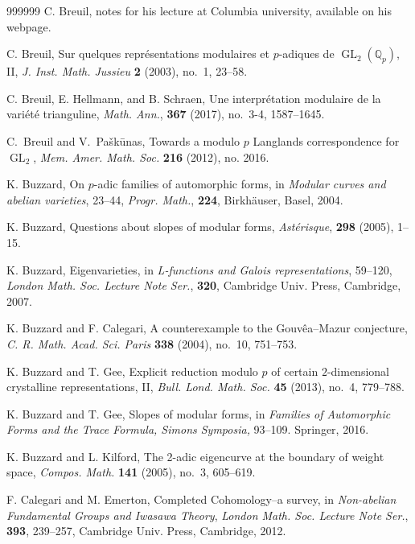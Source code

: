 \documentclass[12pt]{amsart}
\theoremstyle{definition}
\numberwithin{equation}{subsection}
\def\QQ{\mathbb{Q}}
\DeclareMathOperator{\GL}{GL}
\begin{document}
\begin{thebibliography}{999999}
C. Breuil, notes for his lecture at Columbia university, available
on his webpage.

C. Breuil, Sur quelques repr\'esentations modulaires et $p$-adiques de $\GL_2(\QQ_p)$, II, {\it
J. Inst. Math. Jussieu} {\bf 2} (2003), no.~1,  23--58.


C. Breuil, E. Hellmann, and B. Schraen, Une interpr\'etation modulaire de la vari\'et\'e trianguline, {\it Math. Ann.}, {\bf 367} (2017), no.~3-4, 1587--1645.

C.~Breuil and V.~Pa\v sk\=unas, Towards a modulo $p$ Langlands correspondence for $\GL_2$, {\it Mem. Amer. Math. Soc.} {\bf 216} (2012), no. 2016.



K. Buzzard,
On $p$-adic families of automorphic forms, in {\it Modular curves and abelian varieties}, 23--44, {\it Progr. Math.}, {\bf 224}, Birkh\"auser, Basel, 2004.

K. Buzzard,
Questions about slopes of modular forms,  {\it Ast\'erisque}, {\bf 298} (2005), 1--15.


K. Buzzard,
Eigenvarieties, in {\it L-functions and Galois representations}, 59--120,
{\it London Math. Soc. Lecture Note Ser.}, {\bf 320}, Cambridge Univ. Press, Cambridge, 2007.


K. Buzzard and F. Calegari,
A counterexample to the Gouv\^ea--Mazur conjecture, {\it C. R. Math. Acad. Sci. Paris} {\bf 338} (2004), no.~10, 751--753.

K. Buzzard and T. Gee,
Explicit reduction modulo $p$ of certain $2$-dimensional crystalline representations, II, {\it Bull. Lond. Math. Soc.} {\bf 45} (2013), no.~4,  779--788.

K. Buzzard and T. Gee,
Slopes of modular forms, in {\it Families of Automorphic Forms and the Trace Formula, Simons Symposia,} 93--109. Springer, 2016.

K. Buzzard and L. Kilford,
The 2-adic eigencurve at the boundary of weight space,
{\it Compos. Math.} {\bf 141} (2005), no.~3, 605--619.


F. Calegari and M. Emerton,
Completed Cohomology--a survey, in {\it Non-abelian Fundamental Groups and Iwasawa Theory}, {\it London Math. Soc. Lecture Note Ser.}, {\bf 393}, 239--257, Cambridge Univ. Press, Cambridge, 2012.


\end{thebibliography}
\end{document}
